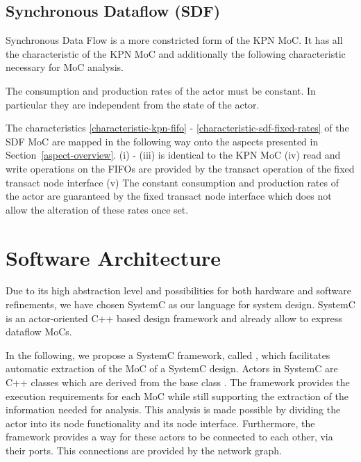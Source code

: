 \subsection{Synchronous Dataflow (SDF)}
Synchronous Data Flow \cite{Lee87b:1987} is a more constricted form of the
KPN MoC. It has all the characteristic of the KPN MoC and additionally the
following characteristic necessary for MoC analysis.

\begin{characteristic}\label{characteristic-sdf-fixed-rates}
The consumption and production rates of the actor must be constant.
In particular they are independent from the state of the actor.
\end{characteristic}

The characteristics \ref{characteristic-kpn-fifo} -
\ref{characteristic-sdf-fixed-rates} of the SDF MoC are mapped in the following way
onto the aspects presented in Section~\ref{aspect-overview}. (i) - (iii) is identical
to the KPN MoC
(iv) read and write operations on the FIFOs are provided by the transact
operation of the fixed transact node interface
(v) The constant consumption and production rates of the actor are
guaranteed by the fixed transact node interface which does
not allow the alteration of these rates once set.

\section{Software Architecture}\label{software-architecture}

Due to its high abstraction level and possibilities for both
hardware and software refinements, we have chosen SystemC
\cite{systemc-lrm:2003} \cite{glms:2002} as our language for system design.
SystemC is an actor-oriented C++ based design framework and
already allow to express dataflow MoCs. 

In the following, we propose a SystemC framework, called \SysteMoC, which
facilitates automatic extraction of the MoC of a SystemC design.
Actors in SystemC are C++ classes which are derived from the base class .
The \SysteMoC{} framework provides the execution requirements for each MoC while
still supporting the extraction of the information needed for analysis.
This analysis is made possible by dividing the actor into its
node functionality and its node interface.
Furthermore, the \SysteMoC{} framework provides a way for these
actors to be connected to each other, via their ports. This connections
are provided by the network graph.

